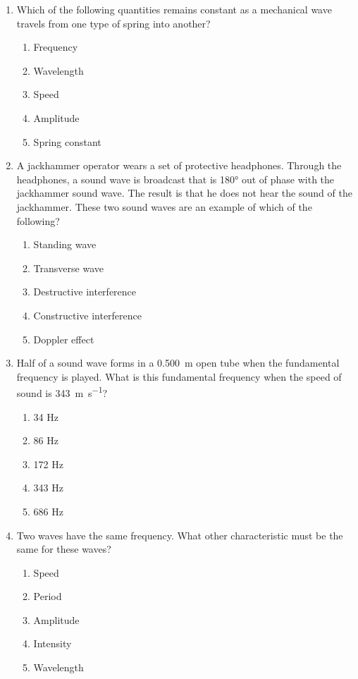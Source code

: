 \documentclass{../../../oss-classkick}
\begin{document}
\begin{multicols}{2}
\begin{enumerate}[leftmargin=18pt]
  \item Which of the following quantities remains constant as a mechanical
    wave travels from one type of spring into another?
    \begin{enumerate}[nosep,leftmargin=18pt,label=(\Alph*)]
    \item Frequency
    \item Wavelength
    \item Speed
    \item Amplitude
    \item Spring constant
    \end{enumerate}
    \vspace{.7in}
    
  \item A jackhammer operator wears a set of protective headphones. Through the
    headphones, a sound wave is broadcast that is \ang{180} out of phase with
    the jackhammer sound wave. The result is that he does not hear the sound of
    the jackhammer. These two sound waves are an example of which of the
    following?
    \begin{enumerate}[nosep,leftmargin=18pt,label=(\Alph*)]
    \item Standing wave
    \item Transverse wave
    \item Destructive interference
    \item Constructive interference
    \item Doppler effect
    \end{enumerate}
    \vspace{.7in}
    
  \item Half of a sound wave forms in a \SI{.500}{\metre} open tube when the
    fundamental frequency is played. What is this fundamental frequency
    when the speed of sound is \SI{343}{\metre\per\second}?
    \begin{enumerate}[nosep,leftmargin=18pt,label=(\Alph*)]
    \item 34 Hz
    \item 86 Hz
    \item 172 Hz
    \item 343 Hz
    \item 686 Hz
    \end{enumerate}
    \columnbreak
    
  \item Two waves have the same frequency. What other characteristic must be
    the same for these waves?
    \begin{enumerate}[nosep,leftmargin=18pt,label=(\Alph*)]
    \item Speed
    \item Period
    \item Amplitude
    \item Intensity
    \item Wavelength
    \end{enumerate}


\end{enumerate}
\end{multicols}
\end{document}
